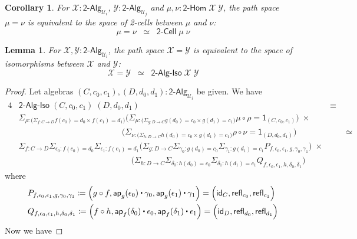 \documentclass[reqno,10pt,a4paper,oneside]{amsart}
\newcommand{\X}{\mathcal{X}}
\newcommand{\Y}{\mathcal{Y}}
\newcommand{\comp}{\circ}
\newcommand{\idfun}[1]{\mathsf{id}_{#1}}
\newcommand{\sm}[1]{\Sigma_{#1}}
\newcommand{\defeq}{\coloneqq}
\newcommand{\refl}{\mathsf{refl}}
\newcommand{\one}{\mathsf{1}}
\newcommand{\UU}{\mathcal{U}}
\newcommand{\BoolAlg}{\mathsf{2}\text{-}\mathsf{Alg}}
\newcommand{\BoolHom}{\mathsf{2}\text{-}\mathsf{Hom}}
\newcommand{\BoolCell}{\mathsf{2}\text{-}\mathsf{Cell}}
\newcommand{\app}{\mathsf{ap}}
\newcommand{\BoolAlgIso}{\mathsf{2}\text{-}\mathsf{Alg}\text{-}\mathsf{Iso}}
\newcommand{\ct}{%
  \mathchoice{\mathbin{\raisebox{0.5ex}{$\displaystyle\centerdot$}}}%
             {\mathbin{\raisebox{0.5ex}{$\centerdot$}}}%
             {\mathbin{\raisebox{0.25ex}{$\scriptstyle\,\centerdot\,$}}}%
             {\mathbin{\raisebox{0.1ex}{$\scriptscriptstyle\,\centerdot\,$}}}}
\numberwithin{equation}{section}
\theoremstyle{mythm}
\newtheorem{lemma}[theorem]{Lemma}
\newtheorem{corollary}[theorem]{Corollary}
\theoremstyle{mydef}
\theoremstyle{myrmk}
\begin{document}
\begin{corollary}\label{BoolHomSpace}
For $\X : \BoolAlg_{\UU_i}$, $\Y : \BoolAlg_{\UU_j}$ and $\mu,\nu : \BoolHom \; \X \; \Y$, the path space $\mu = \nu$ is equivalent to the space of 2-cells between $\mu$ and $\nu$:
\[ \mu = \nu \;\; \simeq \;\; \BoolCell \; \mu \; \nu \] 
\end{corollary}

\begin{lemma}\label{BoolAlgSpace}
For $\X,\Y : \BoolAlg_{\UU_i}$, the path space $\X = \Y$ is equivalent to the space of isomorphisms between $\X$ and $\Y$:
\[ \X = \Y \;\; \simeq \;\; \BoolAlgIso \; \X \; \Y \] 
\end{lemma}
\begin{proof}
Let algebras $(C,c_0,c_1), (D,d_0,d_1) : \BoolAlg_{\UU_i}$ be given. We have
\begin{alignat*}{4}
& \BoolAlgIso \; (C,c_0,c_1) \; (D,d_0,d_1) & \equiv \\
& \sm{\rho : \big(\sm{f:C\to D} f(c_0) =d_0 \times f(c_1) = d_1\big)} \Big(\sm{\mu : \big(\sm{g:D\to C} g(d_0)=c_0 \times g(d_1)=c_1\big)} \mu \comp \rho = \one_{(C,c_0,c_1)} \Big)\; \times & \\
& \;\;\;\;\;\;\;\;\;\;\;\;\;\;\;\;\;\;\;\;\;\;\;\;\;\;\;\;\;\;\;\;\;\;\;\;\;\;\;\;\;\;\;\;\;\Big(\sm{\nu : \big(\sm{h:D\to C} h(d_0)=c_0 \times g(d_1)=c_1\big)} \rho \comp \nu = \one_{(D,d_0,d_1)}\Big) & \;\;\;\;\;\;\; \simeq \\
& \sm{f : C\to D} \sm{\epsilon_0 : f(c_0)=d_0} \sm{\epsilon_1 : f(c_1) = d_1} \Big(\sm{g:D\to C} \sm{\gamma_0 : g(d_0)=c_0} \sm{\gamma_1 : g(d_1) = c_1} P_{f,\epsilon_0,\epsilon_1,g,\gamma_0,\gamma_1}\Big) \; \times & \\
& \;\;\;\;\;\;\;\;\;\;\;\;\;\;\;\;\;\;\;\;\;\;\;\;\;\;\;\;\;\;\;\;\;\;\;\;\;\;\;\;\;\;\;\;\;\;\;\;\; \Big(\sm{h:D\to C} \sm{\delta_0 : h(d_0)=c_0} \sm{\delta_1 : h(d_1) = c_1} Q_{f,\epsilon_0,\epsilon_1,h,\delta_0,\delta_1} \Big) &
\end{alignat*}
where
\begin{align*}
& P_{f,\epsilon_0,\epsilon_1,g,\gamma_0,\gamma_1} \defeq \Big(g \comp f, \app_g(\epsilon_0) \ct \gamma_0, \app_g(\epsilon_1) \ct \gamma_1\Big) = \Big(\idfun{C}, \refl_{c_0}, \refl_{c_1}\Big) \\
& Q_{f,\epsilon_0,\epsilon_1,h,\delta_0,\delta_1} \defeq \Big(f \comp h, \app_f(\delta_0) \ct \epsilon_0, \app_f(\delta_1) \ct \epsilon_1\Big) = \Big(\idfun{D}, \refl_{d_0}, \refl_{d_1}\Big)
\end{align*}
Now we have

\end{proof}
\end{document}
